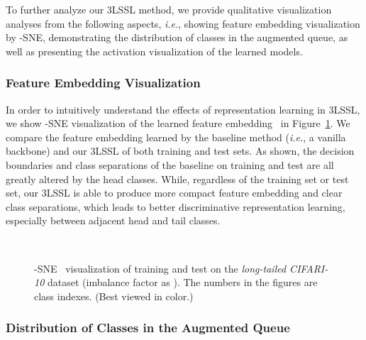 \documentclass[10pt,journal,compsoc]{IEEEtran}
\newcommand{\ie}{\emph{i.e.}}
\begin{document}
To further analyze our 3LSSL method, we provide qualitative visualization analyses from the following aspects, \ie, showing feature embedding visualization by -SNE, demonstrating the distribution of classes in the augmented queue, as well as presenting the activation visualization of the learned models.

\subsubsection{Feature Embedding Visualization}

In order to intuitively understand the effects of representation learning in 3LSSL, we show -SNE visualization of the learned feature embedding~\cite{tsne} in Figure~\ref{fig:tsne}. We compare the feature embedding learned by the baseline method (\ie, a vanilla backbone) and our 3LSSL of both training and test sets. As shown, the decision boundaries and class separations of the baseline on training and test are all greatly altered by the head classes. While, regardless of the training set or test set, our 3LSSL is able to produce more compact feature embedding and clear class separations, which leads to better discriminative representation learning, especially between adjacent head and tail classes.

\begin{figure}[t!]
	\centering
	\\
\caption{\small -SNE~\cite{tsne} visualization of training and test on the \emph{long-tailed CIFARI-10} dataset (imbalance factor as ). The numbers in the figures are class indexes. (Best viewed in color.)}
	\label{fig:tsne}
\end{figure}

\subsubsection{Distribution of Classes in the Augmented Queue}
\end{document}
